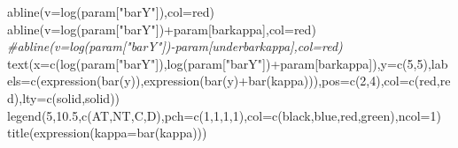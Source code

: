 \documentclass[
]{book}
\newenvironment{Shaded}{\begin{snugshade}}{\end{snugshade}}
\newcommand{\AttributeTok}[1]{\textcolor[rgb]{0.77,0.63,0.00}{#1}}
\newcommand{\CommentTok}[1]{\textcolor[rgb]{0.56,0.35,0.01}{\textit{#1}}}
\newcommand{\DecValTok}[1]{\textcolor[rgb]{0.00,0.00,0.81}{#1}}
\newcommand{\FloatTok}[1]{\textcolor[rgb]{0.00,0.00,0.81}{#1}}
\newcommand{\FunctionTok}[1]{\textcolor[rgb]{0.00,0.00,0.00}{#1}}
\newcommand{\NormalTok}[1]{#1}
\newcommand{\SpecialCharTok}[1]{\textcolor[rgb]{0.00,0.00,0.00}{#1}}
\newcommand{\StringTok}[1]{\textcolor[rgb]{0.31,0.60,0.02}{#1}}
\theoremstyle{definition}
\theoremstyle{definition}
\theoremstyle{definition}
\theoremstyle{definition}
\theoremstyle{remark}
\begin{document}
\begin{Shaded}
\begin{Highlighting}[]
\FunctionTok{abline}\NormalTok{(}\AttributeTok{v=}\FunctionTok{log}\NormalTok{(param[}\StringTok{"barY"}\NormalTok{]),}\AttributeTok{col=}\StringTok{\textquotesingle{}red\textquotesingle{}}\NormalTok{)}
\FunctionTok{abline}\NormalTok{(}\AttributeTok{v=}\FunctionTok{log}\NormalTok{(param[}\StringTok{"barY"}\NormalTok{])}\SpecialCharTok{+}\NormalTok{param[}\StringTok{\textquotesingle{}barkappa\textquotesingle{}}\NormalTok{],}\AttributeTok{col=}\StringTok{\textquotesingle{}red\textquotesingle{}}\NormalTok{)}
\CommentTok{\#abline(v=log(param["barY"]){-}param[\textquotesingle{}underbarkappa\textquotesingle{}],col=\textquotesingle{}red\textquotesingle{})}
\FunctionTok{text}\NormalTok{(}\AttributeTok{x=}\FunctionTok{c}\NormalTok{(}\FunctionTok{log}\NormalTok{(param[}\StringTok{"barY"}\NormalTok{]),}\FunctionTok{log}\NormalTok{(param[}\StringTok{"barY"}\NormalTok{])}\SpecialCharTok{+}\NormalTok{param[}\StringTok{\textquotesingle{}barkappa\textquotesingle{}}\NormalTok{]),}\AttributeTok{y=}\FunctionTok{c}\NormalTok{(}\DecValTok{5}\NormalTok{,}\DecValTok{5}\NormalTok{),}\AttributeTok{labels=}\FunctionTok{c}\NormalTok{(}\FunctionTok{expression}\NormalTok{(}\FunctionTok{bar}\NormalTok{(}\StringTok{\textquotesingle{}y\textquotesingle{}}\NormalTok{)),}\FunctionTok{expression}\NormalTok{(}\FunctionTok{bar}\NormalTok{(}\StringTok{\textquotesingle{}y\textquotesingle{}}\NormalTok{)}\SpecialCharTok{+}\FunctionTok{bar}\NormalTok{(kappa))),}\AttributeTok{pos=}\FunctionTok{c}\NormalTok{(}\DecValTok{2}\NormalTok{,}\DecValTok{4}\NormalTok{),}\AttributeTok{col=}\FunctionTok{c}\NormalTok{(}\StringTok{\textquotesingle{}red\textquotesingle{}}\NormalTok{,}\StringTok{\textquotesingle{}red\textquotesingle{}}\NormalTok{),}\AttributeTok{lty=}\FunctionTok{c}\NormalTok{(}\StringTok{\textquotesingle{}solid\textquotesingle{}}\NormalTok{,}\StringTok{\textquotesingle{}solid\textquotesingle{}}\NormalTok{))}
\FunctionTok{legend}\NormalTok{(}\DecValTok{5}\NormalTok{,}\FloatTok{10.5}\NormalTok{,}\FunctionTok{c}\NormalTok{(}\StringTok{\textquotesingle{}AT\textquotesingle{}}\NormalTok{,}\StringTok{\textquotesingle{}NT\textquotesingle{}}\NormalTok{,}\StringTok{\textquotesingle{}C\textquotesingle{}}\NormalTok{,}\StringTok{\textquotesingle{}D\textquotesingle{}}\NormalTok{),}\AttributeTok{pch=}\FunctionTok{c}\NormalTok{(}\DecValTok{1}\NormalTok{,}\DecValTok{1}\NormalTok{,}\DecValTok{1}\NormalTok{,}\DecValTok{1}\NormalTok{),}\AttributeTok{col=}\FunctionTok{c}\NormalTok{(}\StringTok{\textquotesingle{}black\textquotesingle{}}\NormalTok{,}\StringTok{\textquotesingle{}blue\textquotesingle{}}\NormalTok{,}\StringTok{\textquotesingle{}red\textquotesingle{}}\NormalTok{,}\StringTok{\textquotesingle{}green\textquotesingle{}}\NormalTok{),}\AttributeTok{ncol=}\DecValTok{1}\NormalTok{)}
\FunctionTok{title}\NormalTok{(}\FunctionTok{expression}\NormalTok{(}\AttributeTok{kappa=}\FunctionTok{bar}\NormalTok{(kappa)))}


\end{Highlighting}
\end{Shaded}
\end{document}
